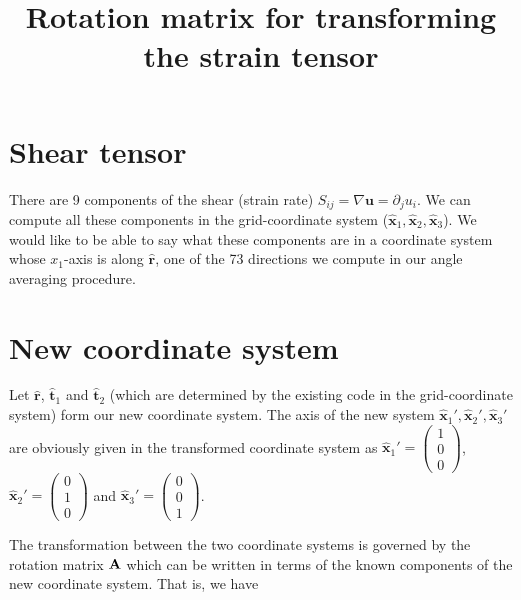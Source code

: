 \documentclass[12pt]{article}
\title{Rotation matrix for transforming the strain tensor}
\newcommand{\grad}{\nabla}
\begin{document}
\section*{Shear tensor}
There are 9 components of the shear (strain rate) $S_{ij} = \grad {\bm u} =
\partial_j u_i$. We can compute all these components in the
grid-coordinate system ($\bm{{\hat x}}_1,\bm{{\hat x}}_2, \bm{{\hat
x}}_3$). We would like to be able to say what these components are in
a coordinate system whose $x_1$-axis is along $\bm{{\hat r}}$, one of
the 73 directions we compute in our angle averaging procedure.

\section*{New coordinate system}
Let $\bm{{\hat r}}$, $\bm{{\hat t}}_1$
and $\bm{{\hat t}}_2$ (which are determined by the existing code in the grid-coordinate system) form our new coordinate system.
The axis of the new system $\bm{{\hat x}}_1',\bm{{\hat x}}_2',
\bm{{\hat x}}_3'$ are obviously 
given in the transformed coordinate system as $\bm{{\hat x}}_1' =
\left(\begin{array}{c} 1 \\ 0 \\0
\end{array}\right)$, $\bm{{\hat x}}_2' = \left(\begin{array}{c} 0 \\ 1
\\0 \end{array}\right)$ and $\bm{{\hat x}}_3' = \left(\begin{array}{c}
0 \\ 0 \\1 \end{array}\right)$.

The transformation between the two coordinate systems is governed by
the rotation matrix ${\bf A}$ which can be written in terms of the
known components of the new coordinate system. That is, we have 
\end{document}
